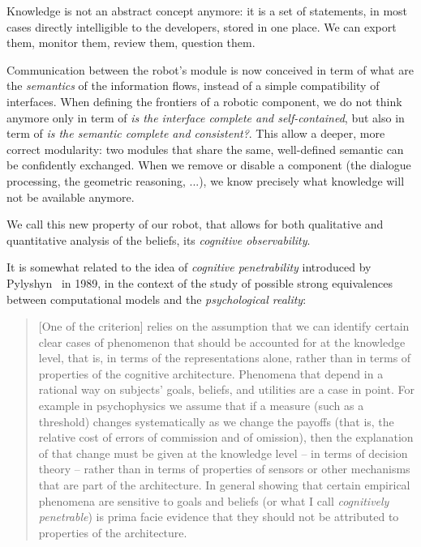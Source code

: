 \documentclass[letterpaper, 10 pt, conference]{ieeeconf}  %
\begin{document}
Knowledge is not an abstract concept anymore: it is a set of statements, in
most cases directly intelligible to the developers, stored in one place. We can
export them, monitor them, review them, question them.

Communication between the robot's module is now conceived in term of what are
the \emph{semantics} of the information flows, instead of a simple
compatibility of interfaces. When defining the frontiers of a robotic
component, we do not think anymore only in term of \emph{is the interface complete
and self-contained}, but also in term of \emph{is the semantic complete and
consistent?}. This allow a deeper, more correct modularity: two modules that
share the same, well-defined semantic can be confidently exchanged. When we
remove or disable a component (the dialogue processing, the geometric
reasoning, ...), we know precisely what knowledge will not be available
anymore.

We call this new property of our robot, that allows for both qualitative and
quantitative analysis of the beliefs, its \emph{cognitive observability}.

It is somewhat related to the idea of \emph{cognitive penetrability} introduced
by Pylyshyn~\cite{Pylyshyn1989} in 1989, in the context of the study of
possible strong equivalences between computational models and the
\emph{psychological reality}:

\begin{quote}

    [One of the criterion] relies on the assumption that we can identify
    certain clear cases of phenomenon that should be accounted for at the
    knowledge level, that is, in terms of the representations alone, rather
    than in terms of properties of the cognitive architecture. Phenomena that
    depend in a rational way on subjects' goals, beliefs, and utilities are a
    case in point. For example in psychophysics we assume that if a measure
    (such as a threshold) changes systematically as we change the payoffs (that
    is, the relative cost of errors of commission and of omission), then the
    explanation of that change must be given at the knowledge level -- in terms
    of decision theory -- rather than in terms of properties of sensors or
    other mechanisms that are part of the architecture. In general showing that
    certain empirical phenomena are sensitive to goals and beliefs (or what I
    call \emph{cognitively penetrable}) is prima facie evidence that they
    should not be attributed to properties of the architecture.

\end{quote}
\end{document}
